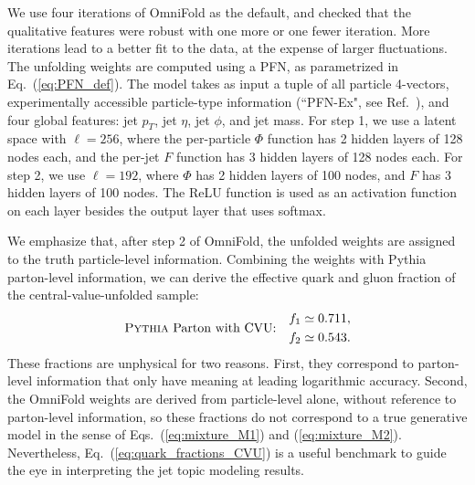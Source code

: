 \documentclass[aps,prd,twocolumn,preprintnumbers,nofootinbib,longbibliography,floatfix]{revtex4-1}
\DeclareRobustCommand{\Eq}[1]{Eq.~(\ref{#1})}
\DeclareRobustCommand{\Eqs}[2]{Eqs.~(\ref{#1}) and (\ref{#2})}
\DeclareRobustCommand{\Ref}[1]{Ref.~\cite{#1}}
\newcommand{\Pythia}{{\sc Pythia}\xspace}
\newcommand{\OmniFold}{{\sc OmniFold}\xspace}
\newcommand{\cor}[1]{#1}
\begin{document}
We use four iterations of \OmniFold as the default, and checked that the qualitative features were robust with one more or one fewer iteration.
%
\cor{More iterations lead to a better fit to the data, at the expense of larger fluctuations.}
%
The unfolding weights are computed using a PFN, as parametrized in \Eq{eq:PFN_def}.
%
The model takes as input a tuple of all particle 4-vectors, experimentally accessible particle-type information (``PFN-Ex", see \Ref{Komiske:2018cqr}), and four global features: jet $p_T$, jet $\eta$, jet $\phi$, and jet mass.
%
For step 1, we use a latent space with $\ell = 256$, where the per-particle $\Phi$ function has 2 hidden layers of 128 nodes each, and the per-jet $F$ function has 3 hidden layers of 128 nodes each.
%
For step 2, we use $\ell = 192$, where $\Phi$ has 2 hidden layers of 100 nodes, and $F$ has 3 hidden layers of 100 nodes.
%
%
The ReLU function is used as an activation function on each layer besides the output layer that uses softmax.

\begin{figure*}[t]
\centering
{}
%
\caption{Validation of central value unfolding with \OmniFold applied to the CMS 2011 Open Data.
%
Shown are distributions for (a) jet $p_T$, (b) jet azimuth, and (c) jet pseudorapidity.
%
The detector-level distributions after 
\cor{using the unfolding weights} (green) match better to the CMS measured distributions (black) than to \Pythia run through the CMS detector simulation (orange).
%
Note the smaller jet $p_T$ range for the azimuth and pseudorapidity plots.
%
The error bars on the open data/simulation correspond to statistical uncertainties, while the green band corresponds to using 3 or 5 iterations of \OmniFold compared to the default of 4.
}
\label{fig:unfolding_jet}
\end{figure*}


We emphasize that, after step 2 of \OmniFold, the unfolded weights are assigned to the truth particle-level information.
%
Combining the weights with \Pythia parton-level information, we can derive the effective quark and gluon fraction of the central-value-unfolded sample:
% 
\begin{equation}
	\label{eq:quark_fractions_CVU}
	\text{\Pythia Parton with CVU:} \quad
	\begin{aligned}
		f_1 \simeq 0.711,\\
		f_2 \simeq 0.543.
	\end{aligned}
\end{equation}
%
These fractions are unphysical for two reasons.
%
First, they correspond to parton-level information that only have meaning at leading logarithmic accuracy.
%
Second, the \OmniFold weights are derived from particle-level alone, without reference to parton-level information, so these fractions do not correspond to a true generative model in the sense of \Eqs{eq:mixture_M1}{eq:mixture_M2}.
%
Nevertheless, \Eq{eq:quark_fractions_CVU} is a useful benchmark to guide the eye in interpreting the jet topic modeling results.
\end{document}
